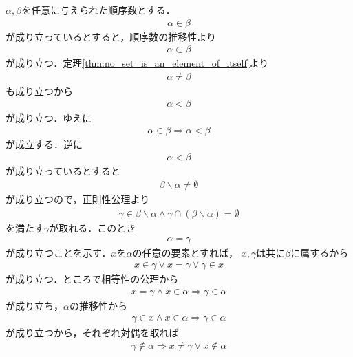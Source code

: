 	\begin{prf}
		$\alpha,\beta$を任意に与えられた順序数とする．
		\begin{align}
			\alpha \in \beta
		\end{align}
		が成り立っているとすると，順序数の推移性より
		\begin{align}
			\alpha \subset \beta
		\end{align}
		が成り立つ．定理\ref{thm:no_set_is_an_element_of_itself}より
		\begin{align}
			\alpha \neq \beta
		\end{align}
		も成り立つから
		\begin{align}
			\alpha < \beta
		\end{align}
		が成り立つ．ゆえに
		\begin{align}
			\alpha \in \beta \Longrightarrow \alpha < \beta
		\end{align}
		が成立する．逆に
		\begin{align}
			\alpha < \beta
		\end{align}
		が成り立っているとすると
		\begin{align}
			\beta \backslash \alpha \neq \emptyset
		\end{align}
		が成り立つので，正則性公理より
		\begin{align}
			\gamma \in \beta \backslash \alpha \wedge \gamma \cap (\beta \backslash \alpha) = \emptyset
		\end{align}
		を満たす$\gamma$が取れる．このとき
		\begin{align}
			\alpha = \gamma
		\end{align}
		が成り立つことを示す．$x$を$\alpha$の任意の要素とすれば，
		$x,\gamma$は共に$\beta$に属するから
		\begin{align}
			x \in \gamma \vee x = \gamma \vee \gamma \in x
			\label{eq:thm_element_and_proper_subset_correspond_between_ordinal_numbers_1}
		\end{align}
		が成り立つ．ところで相等性の公理から
		\begin{align}
			x = \gamma \wedge x \in \alpha \Longrightarrow \gamma \in \alpha
		\end{align}
		が成り立ち，$\alpha$の推移性から
		\begin{align}
			\gamma \in x \wedge x \in \alpha \Longrightarrow \gamma \in \alpha
		\end{align}
		が成り立つから，それぞれ対偶を取れば
		\begin{align}
			\gamma \notin \alpha \Longrightarrow x \neq \gamma \vee x \notin \alpha

\end{align}
\end{prf}
